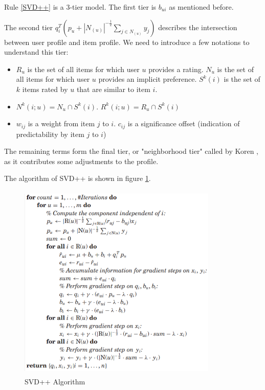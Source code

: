 \documentclass[letter paper, 11pt]{article}
\begin{document}
	
	Rule \ref{SVD++} is a 3-tier model. The first tier is $b_{ui}$ as mentioned before. 
	
	
	The second tier $q_i^T  (p_u + |N_{(u)}|^{-\frac{1}{2}} \sum_{j \in N_{(u)}}y_j)$ describes the intersection between user profile and item profile. We need to introduce a few notations to understand this tier:
	\begin{itemize}
		\item $R_u$ is the set of all items for which user $u$ provides a rating. $N_u$ is the set of all items for which user $u$ provides an implicit preference. $S^k(i)$ is the set of $k$ items rated by $u$ that are similar to item $i$.
		
		\item $N^k{(i; u)} = N_u \cap S^k (i)$. $R^k{(i; u)} = R_u \cap S^k (i)$
		
		\item $w_{ij}$ is a weight from item $j$ to $i$. $c_{ij}$ is a significance offset (indication of predictability by item $j$ to $i$)
	\end{itemize}
	
	The remaining terms form the final tier, or "neighborhood tier" called by Koren \cite{korenFactorization}, as it contributes some adjustments to the profile.
	
	The algorithm of SVD++ is shown in figure \ref{SVD++-Algo}.
	
	\begin{figure}[h]
		\centering
		\caption{SVD++ Algorithm}
		\label{SVD++-Algo}
		\includegraphics[width=9.5cm, height=9.5cm]{SVD++.png}
	\end{figure}
	
\end{document}
